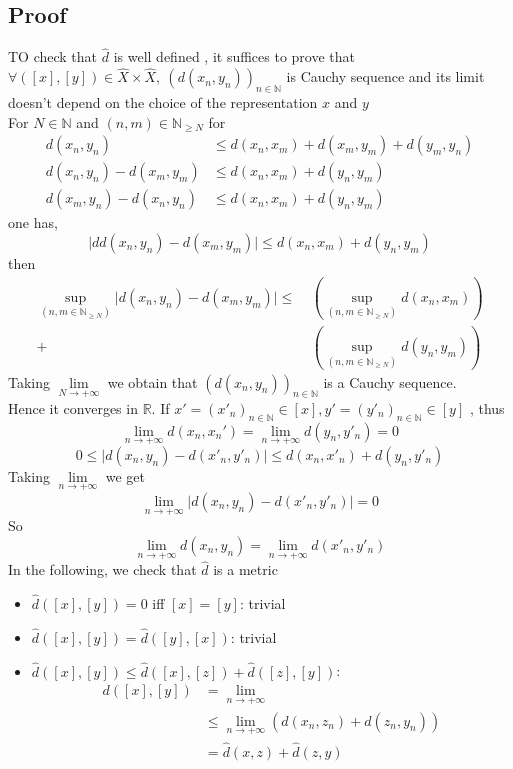 \documentclass{book}
\begin{document}
\subsection*{Proof}
TO check that $\hat{d}$ is well defined , it suffices to prove that $\forall([x],[y])\in \hat{X}\times\hat{X},\ (d(x_n,y_n))_{n\in \mathbb{N}}$ is Cauchy sequence and its limit doesn't depend on the choice of the representation $x$ and $y$
\\For $N\in\mathbb{N}$ and $(n,m)\in \mathbb{N}_{\geq N}$ 
for $$
\begin{aligned}
    d(x_n,y_n) &\leq d(x_n,x_m)+d(x_m,y_m)+d(y_m,y_n)\\
    d(x_n,y_n)-d(x_m,y_m) &\leq d(x_n,x_m)+d(y_n,y_m)\\
    d(x_m,y_n)-d(x_n,y_n) &\leq d(x_n,x_m)+d(y_n,y_m)
\end{aligned}$$
one has,
$$\lvert dd(x_n,y_n)-d(x_m,y_m)\rvert\leq d(x_n,x_m)+d(y_n,y_m)$$
then
$$\begin{aligned}
    \sup\limits_{(n,m\in\mathbb{N}_{\geq N})}\lvert d(x_n,y_n)-d(x_m,y_m)\rvert\leq\ &(\sup\limits_{(n,m\in\mathbb{N}_{\geq N})}d(x_n,x_m))\\+&(\sup\limits_{(n,m\in\mathbb{N}_{\geq N})}d(y_n,y_m))
\end{aligned}$$
Taking $\lim\limits_{N\rightarrow+\infty}$ we obtain that $(d(x_n,y_n))_{n\in \mathbb{N}}$ is a Cauchy sequence.\\
Hence it converges in $\mathbb{R}$. If $x'=(x'_n)_{n\in \mathbb{N}}\in [x],y'=(y'_n)_{n\in \mathbb{N}}\in [y]$  , thus $$\lim\limits_{n\rightarrow+\infty} d(x_n,x_n')=\lim\limits_{n\rightarrow+\infty} d(y_n,y'_n)=0$$$$0\leq\lvert d(x_n,y_n)-d(x'_n,y'_n)\rvert\leq d(x_n,x'_n)+d(y_n,y'_n)$$
Taking $\lim\limits_{n\rightarrow+\infty}$ we get $$\lim\limits_{n\rightarrow+\infty}\lvert d(x_n,y_n)-d(x'_n,y'_n)\rvert=0$$
So
$$\lim\limits_{n\rightarrow+\infty}d(x_n,y_n)=\lim\limits_{n\rightarrow+\infty}d(x'_n,y'_n)$$
In the following, we check that $\hat{d}$ is a metric
\begin{itemize}
    \item $\hat{d}([x],[y])=0$ iff $[x]=[y]$: trivial
    \item $\hat{d}([x],[y])=\hat{d}([y],[x])$: trivial
    \item $\hat{d}([x],[y])\leq\hat{d}([x],[z])+\hat{d}([z],[y])$:
    $$\begin{aligned}
        d([x],[y]) &=\lim\limits_{n\rightarrow+\infty}\\
        &\leq\lim\limits_{n\rightarrow+\infty}(d(x_n,z_n)+d(z_n,y_n))\\
        &=\hat{d}(x,z)+\hat{d}(z,y)
    \end{aligned}$$
\end{itemize}
\end{document}
